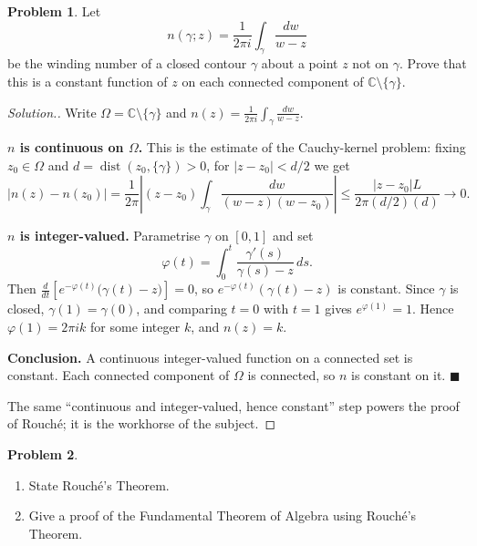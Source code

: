 \documentclass[11pt,a4paper]{article}
\theoremstyle{definition}
\newtheorem{problemx}{Problem}[section]
\newenvironment{problem}{\begin{problemx}}{\end{problemx}}
\newenvironment{solution}
  {\renewcommand{\qedsymbol}{}\begin{proof}[\textit{Solution}.]}
  {\end{proof}}
\begin{document}
\begin{problem}
Let
$$n(\gamma; z) = \frac{1}{2\pi i}\int_{\gamma}\frac{dw}{w - z}$$
be the winding number of a closed contour $\gamma$ about a point $z$ not on
$\gamma$. Prove that this is a constant function of $z$ on each connected
component of $\mathbb{C}\setminus\{\gamma\}$.
\end{problem}

\begin{solution}
Write $\Omega = \mathbb{C}\setminus\{\gamma\}$ and
$n(z) = \frac{1}{2\pi i}\displaystyle\int_{\gamma}\frac{dw}{w-z}$.

\textbf{$n$ is continuous on $\Omega$.} This is the estimate of the Cauchy-kernel
problem: fixing $z_0 \in \Omega$ and $d = \operatorname{dist}(z_0,\{\gamma\}) > 0$,
for $\left|z-z_0\right| < d/2$ we get
$$\left|n(z)-n(z_0)\right|
= \frac{1}{2\pi}\left|\left(z-z_0\right)\int_{\gamma}\frac{dw}{(w-z)(w-z_0)}\right|
\leq \frac{\left|z-z_0\right| L}{2\pi (d/2)(d)} \longrightarrow 0 .$$

\textbf{$n$ is integer-valued.} Parametrise $\gamma$ on $[0,1]$ and set
$$\varphi(t) = \int^{t}_{0}\frac{\gamma'(s)}{\gamma(s)-z}\,ds .$$
Then $\frac{d}{dt}\left[e^{-\varphi(t)}\big(\gamma(t)-z\big)\right] = 0$, so
$e^{-\varphi(t)}(\gamma(t)-z)$ is constant. Since $\gamma$ is closed,
$\gamma(1) = \gamma(0)$, and comparing $t=0$ with $t=1$ gives
$e^{\varphi(1)} = 1$. Hence $\varphi(1) = 2\pi i k$ for some integer $k$, and
$n(z) = k$.

\textbf{Conclusion.} A continuous integer-valued function on a connected set is
constant. Each connected component of $\Omega$ is connected, so $n$ is constant on
it. $\blacksquare$

The same ``continuous and integer-valued, hence constant'' step powers the proof of
Rouch\'e; it is the workhorse of the subject.
\end{solution}


\begin{problem}
\begin{enumerate}
\item[(a).] State Rouch\'e's Theorem.
\item[(b).] Give a proof of the Fundamental Theorem of Algebra using Rouch\'e's
Theorem.
\end{enumerate}
\end{problem}
\end{document}
